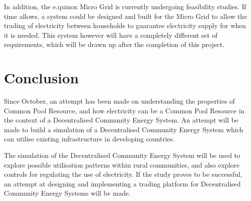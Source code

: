\documentclass{article}
\begin{document}
In addition, the e.quinox Micro Grid is currently undergoing feasibility studies. If time allows, a system could be designed and built for the Micro Grid to allow the trading of electricity between households to guarantee electricity supply for when it is needed. This system however will have a completely different set of requirements, which will be drawn up after the completion of this project.

\section{Conclusion}
Since October, an attempt has been made on understanding the properties of Common Pool Resource, and how electricity can be a Common Pool Resource in the context of a Decentralised Community Energy System. An attempt will be made to build a simulation of a Decentralised Community Energy System which can utilise existing infrastructure in developing countries. 

The simulation of the Decentralised Community Energy System will be used to explore possible utilisation patterns within rural communities, and also explore controls for regulating the use of electricity. If the study proves to be successful, an attempt at designing and implementing a trading platform for Decentralised Community Energy Systems will be made. 


\end{document}
